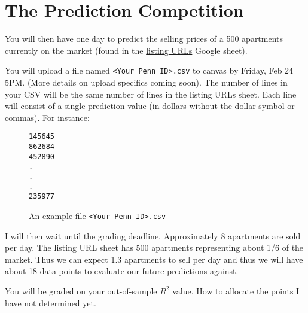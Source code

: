 \documentclass[12pt]{article}
\begin{document}
\section{The Prediction Competition}

You will then have one day to predict the selling prices of a 500 apartments currently on the market (found in the \href{https://docs.google.com/spreadsheets/d/12cOzcQlz9WCayasqB-sx_9E6gjQH0-eCuryqJUucZ50/edit#gid=0}{listing URLs} Google sheet).

You will upload a file named \texttt{<Your Penn ID>.csv} to canvas by Friday, Feb 24 5PM. (More details on upload specifics coming soon). The number of lines in your CSV will be the same number of lines in the listing URLs sheet. Each line will consist of a single prediction value (in dollars without the dollar symbol or commas). For instance:

\begin{figure}[htp]
\begin{Verbatim}[frame=single, fontsize = \small]
145645
862684
452890
.
.
.
235977
\end{Verbatim}
\caption{An example file \texttt{<Your Penn ID>.csv}}
\end{figure}

I will then wait until the grading deadline. Approximately 8 apartments are sold per day. The listing URL sheet has 500 apartments representing about 1/6 of the market. Thus we can expect 1.3 apartments to sell per day and thus we will have about 18 data points to evaluate our future predictions against.

You will be graded on your out-of-sample $R^2$ value. How to allocate the points I have not determined yet.
\end{document}
